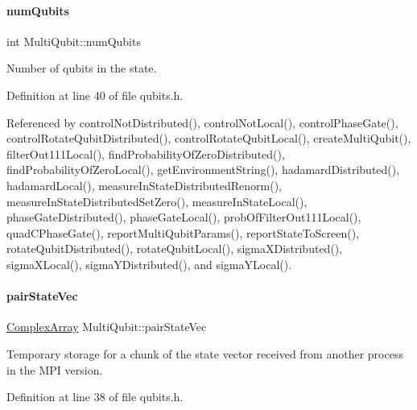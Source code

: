 \mbox{\label{structMultiQubit_ab5b9795bdc6fb5855e1974dcbbaeb36f}} 
\paragraph{\texorpdfstring{num\+Qubits}{numQubits}}
{\footnotesize\ttfamily int Multi\+Qubit\+::num\+Qubits}



Number of qubits in the state. 



Definition at line 40 of file qubits.\+h.



Referenced by control\+Not\+Distributed(), control\+Not\+Local(), control\+Phase\+Gate(), control\+Rotate\+Qubit\+Distributed(), control\+Rotate\+Qubit\+Local(), create\+Multi\+Qubit(), filter\+Out111\+Local(), find\+Probability\+Of\+Zero\+Distributed(), find\+Probability\+Of\+Zero\+Local(), get\+Environment\+String(), hadamard\+Distributed(), hadamard\+Local(), measure\+In\+State\+Distributed\+Renorm(), measure\+In\+State\+Distributed\+Set\+Zero(), measure\+In\+State\+Local(), phase\+Gate\+Distributed(), phase\+Gate\+Local(), prob\+Of\+Filter\+Out111\+Local(), quad\+C\+Phase\+Gate(), report\+Multi\+Qubit\+Params(), report\+State\+To\+Screen(), rotate\+Qubit\+Distributed(), rotate\+Qubit\+Local(), sigma\+X\+Distributed(), sigma\+X\+Local(), sigma\+Y\+Distributed(), and sigma\+Y\+Local().

\mbox{\label{structMultiQubit_a76f7db4eab52d2b30f58f973ada809c5}} 
\paragraph{\texorpdfstring{pair\+State\+Vec}{pairStateVec}}
{\footnotesize\ttfamily \hyperlink{structComplexArray}{Complex\+Array} Multi\+Qubit\+::pair\+State\+Vec}



Temporary storage for a chunk of the state vector received from another process in the M\+PI version. 



Definition at line 38 of file qubits.\+h.



